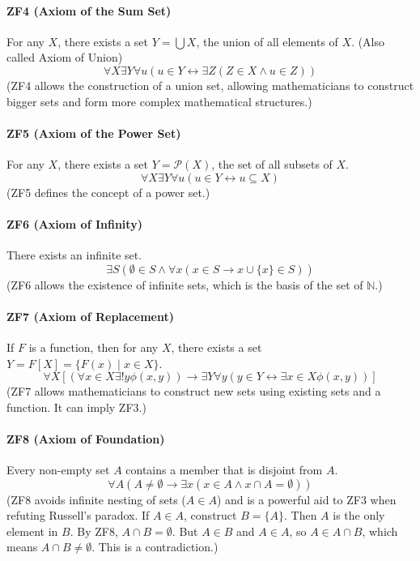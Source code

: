\documentclass[oneside]{book}
\begin{document}
\paragraph{ZF4 (Axiom of the Sum Set)}
For any $X$, there exists a set $Y = \bigcup X$, the union of all elements of $X$. (Also called Axiom of Union)
$$ \forall X \exists Y \forall u (u \in Y \leftrightarrow \exists Z (Z \in X \wedge u \in Z)) $$
(ZF4 allows the construction of a union set, allowing mathematicians to construct bigger sets and form more complex mathematical structures.)

\paragraph{ZF5 (Axiom of the Power Set)}
For any $X$, there exists a set $Y = \mathcal{P}(X)$, the set of all subsets of $X$.
$$ \forall X \exists Y \forall u (u \in Y \leftrightarrow u \subseteq X) $$
(ZF5 defines the concept of a power set.)

\paragraph{ZF6 (Axiom of Infinity)}
There exists an infinite set.
$$ \exists S (\emptyset \in S \wedge \forall x (x \in S \to x \cup \{x\} \in S)) $$
(ZF6 allows the existence of infinite sets, which is the basis of the set of $\mathbb{N}$.)

\paragraph{ZF7 (Axiom of Replacement)}
If $F$ is a function, then for any $X$, there exists a set $Y = F[X] = \{F(x) \mid x \in X\}$.
$$ \forall X [(\forall x \in X \exists! y \phi(x,y)) \to \exists Y \forall y (y \in Y \leftrightarrow \exists x \in X \phi(x,y))] $$
(ZF7 allows mathematicians to construct new sets using existing sets and a function. It can imply ZF3.)

\paragraph{ZF8 (Axiom of Foundation)}
Every non-empty set $A$ contains a member that is disjoint from $A$.
$$ \forall A (A \ne \emptyset \to \exists x (x \in A \wedge x \cap A = \emptyset)) $$
(ZF8 avoids infinite nesting of sets ($A \in A$) and is a powerful aid to ZF3 when refuting Russell's paradox. If $A \in A$, construct $B=\{A\}$. Then $A$ is the only element in $B$. By ZF8, $A \cap B = \emptyset$. But $A \in B$ and $A \in A$, so $A \in A \cap B$, which means $A \cap B \ne \emptyset$. This is a contradiction.)
\end{document}
